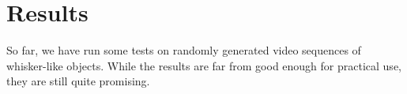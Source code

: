 \section*{Results}
So far, we have run some tests on randomly generated video sequences of whisker-like objects. While the results are far from good enough for practical use, they are still quite promising.
